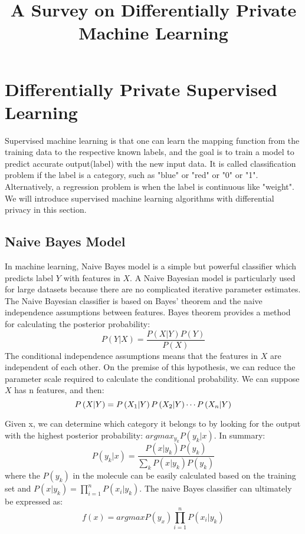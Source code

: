 \documentclass[draftclsnofoot,onecolumn,twoside]{IEEEtran}
\begin{document}
\hypersetup{CJKbookmarks=true}

\title{\huge{A Survey on Differentially Private Machine Learning}}

\maketitle
\section{Differentially Private Supervised Learning}

Supervised machine learning is that one can learn the mapping function from the training data to the respective known labels, and the goal is to train a model to predict accurate output(label) with the new input data. It is called classification problem if the label is a category, such as "blue" or "red" or "0" or "1". Alternatively, a regression problem is when the label is continuous like "weight". We will introduce supervised machine learning algorithms with differential privacy in this section.



\subsection{Naive Bayes Model}
In machine learning, Naive Bayes model is a simple but powerful classifier which predicts label $Y$ with features in $X$. A Naive Bayesian model is particularly used for large datasets because there are no complicated iterative parameter estimates. The Naive Bayesian classifier is based on Bayes' theorem and the naive independence assumptions between features. Bayes theorem provides a method for calculating the posterior probability:
\begin{equation}
P\left(Y|X\right)=\frac{P\left(X|Y\right)P\left(Y\right)}{P\left(X\right)}
\end{equation}
The conditional independence assumptions means that the features in $X$ are independent of each other. On the premise of this hypothesis, we can reduce the parameter scale required to calculate the conditional probability. We can suppose $X$ has n features, and then:
\begin{equation}
P\left(X|Y\right)=P\left(X_1|Y\right)\*P\left(X_2|Y\right)\*\cdots\*P\left(X_n|Y\right)
\end{equation}


Given x, we can determine which category it belongs to by looking for the output with the highest posterior probability: $argmax_{y_k}P\left(y_k|x\right)$. In summary:
\begin{equation}
P\left(y_k|x\right) = \frac{P\left(x|y_k\right)P\left(y_k\right)}{\sum_{k}P\left(x|y_k\right)P\left(y_k\right)}
\end{equation}
where the $P\left(y_k\right)$ in the molecule can be easily calculated based on the training set and $P\left(x|y_k\right) = \prod_{i=1}^{n}P\left(x_i|y_k\right)$. The naive Bayes classifier can ultimately be expressed as:
\begin{equation}
f(x) = argmaxP(y_x)\prod_{i=1}^{n}P\left(x_i|y_k\right)
\end{equation}
\end{document}
